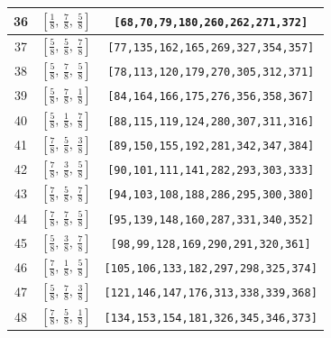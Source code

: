 \documentclass[fleqn,8pt]{jsarticle}
\begin{document}
\begin{longtable}{ccc}
36 & $\left[ \frac{1}{8},\, \frac{7}{8},\, \frac{5}{8} \right]$ & {\tt [68,70,79,180,260,262,271,372]} \\ \hline
37 & $\left[ \frac{5}{8},\, \frac{5}{8},\, \frac{7}{8} \right]$ & {\tt [77,135,162,165,269,327,354,357]} \\ \hline
38 & $\left[ \frac{5}{8},\, \frac{7}{8},\, \frac{5}{8} \right]$ & {\tt [78,113,120,179,270,305,312,371]} \\ \hline
39 & $\left[ \frac{5}{8},\, \frac{7}{8},\, \frac{1}{8} \right]$ & {\tt [84,164,166,175,276,356,358,367]} \\ \hline
40 & $\left[ \frac{5}{8},\, \frac{1}{8},\, \frac{7}{8} \right]$ & {\tt [88,115,119,124,280,307,311,316]} \\ \hline
41 & $\left[ \frac{7}{8},\, \frac{5}{8},\, \frac{3}{8} \right]$ & {\tt [89,150,155,192,281,342,347,384]} \\ \hline
42 & $\left[ \frac{7}{8},\, \frac{3}{8},\, \frac{5}{8} \right]$ & {\tt [90,101,111,141,282,293,303,333]} \\ \hline
43 & $\left[ \frac{7}{8},\, \frac{5}{8},\, \frac{7}{8} \right]$ & {\tt [94,103,108,188,286,295,300,380]} \\ \hline
44 & $\left[ \frac{7}{8},\, \frac{7}{8},\, \frac{5}{8} \right]$ & {\tt [95,139,148,160,287,331,340,352]} \\ \hline
45 & $\left[ \frac{5}{8},\, \frac{3}{8},\, \frac{7}{8} \right]$ & {\tt [98,99,128,169,290,291,320,361]} \\ \hline
46 & $\left[ \frac{7}{8},\, \frac{1}{8},\, \frac{5}{8} \right]$ & {\tt [105,106,133,182,297,298,325,374]} \\ \hline
47 & $\left[ \frac{5}{8},\, \frac{7}{8},\, \frac{3}{8} \right]$ & {\tt [121,146,147,176,313,338,339,368]} \\ \hline
48 & $\left[ \frac{7}{8},\, \frac{5}{8},\, \frac{1}{8} \right]$ & {\tt [134,153,154,181,326,345,346,373]} \\
\end{longtable}
\renewcommand{\arraystretch}{1.2}
\end{document}
